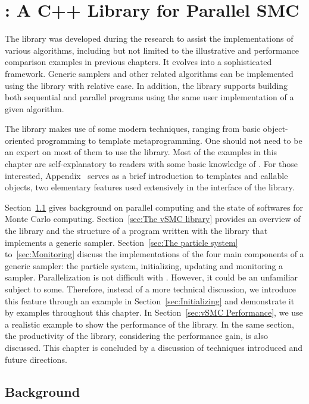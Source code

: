 \chapter[vSMC: A C++ Library for Parallel SMC]{\protect\vsmc: A C++ Library for Parallel SMC}
\label{cha:vSMC: A C++ Library for Parallel SMC}

The \vsmc library was developed during the research to assist the implementations of various \smc algorithms, including but not limited to the illustrative and performance comparison examples in previous chapters. It evolves into a sophisticated \cpp framework. Generic \smc samplers and other related algorithms can be implemented using the library with relative ease. In addition, the library supports building both sequential and parallel programs using the same user implementation of a given algorithm.

The library makes use of some modern \cpp techniques, ranging from basic object-oriented programming to template metaprogramming. One should not need to be an expert on most of them to use the library. Most of the examples in this chapter are self-explanatory to readers with some basic knowledge of \cpp. For those interested, Appendix~ serves as a brief introduction to \cpp templates and callable objects, two elementary features used extensively in the interface of the \vsmc library.

Section~\ref{sec:vSMC Background} gives background on parallel computing and the state of softwares for Monte Carlo computing. Section~\ref{sec:The vSMC library} provides an overview of the library and the structure of a program written with the library that implements a generic \smc sampler. Section~\ref{sec:The particle system} to~\ref{sec:Monitoring} discuss the implementations of the four main components of a generic \smc sampler: the particle system, initializing, updating and monitoring a sampler. Parallelization is not difficult with \vsmc. However, it could be an unfamiliar subject to some. Therefore, instead of a more technical discussion, we introduce this feature through an example in Section~\ref{sec:Initializing} and demonstrate it by examples throughout this chapter. In Section~\ref{sec:vSMC Performance}, we use a realistic example to show the performance of the library. In the same section, the productivity of the library, considering the performance gain, is also discussed. This chapter is concluded by a discussion of techniques introduced and future directions.

\section{Background}
\label{sec:vSMC Background}

